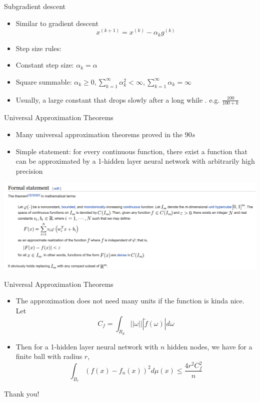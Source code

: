 \documentclass[12pt,notes,mathserif]{beamer}
\newcommand{\chuhao}{\fontsize{44.9pt}{\baselineskip}\selectfont}
\providecommand{\tightlist}{%
	\setlength{\itemsep}{0pt}\setlength{\parskip}{0pt}}
\begin{document}
\begin{frame}{Subgradient descent}

\begin{itemize}
\tightlist
\item
  Similar to gradient descent \[x^{(k+1)}=x^{(k)}-\alpha_k g^{(k)}\]
\item
  Step size rules:
\item
  Constant step size: \(\alpha_k = \alpha\)
\item
  Square summable:
  \(\alpha_k\ge 0, \sum_{k=1}^{\infty} \alpha_k^2 < \infty, \sum_{k=1}^{\infty}\alpha_k =\infty\)
\item
  Usually, a large constant that drops slowly after a long while . e.g.
  \(\frac{100}{100+k}\)
\end{itemize}

\end{frame}

\begin{frame}{Universal Approximation Theorems}

\begin{itemize}
\tightlist
\item
  Many universal approximation theorems proved in the \(90s\)
\item
  Simple statement: for every continuous function, there exist a
  function that can be approximated by a 1-hidden layer neural network
  with arbitrarily high precision
\end{itemize}

\begin{center}
    \includegraphics[width=\textwidth]{2018-04-15-13-11-16.png}
\end{center}

\end{frame}

\begin{frame}{Universal Approximation Theorems}

\begin{itemize}
\tightlist
\item
  The approximation does not need many units if the function is kinda
  nice. Let \[C_{f}=\int_{R_{d}}||\omega|||\tilde{f}(\omega)|d\omega\]
\item
  Then for a 1-hidden layer neural network with \(n\) hidden nodes, we
  have for a finite ball with radius \(r\), \[
  \int_{B_{r}}(f(x)-f_{n}(x))^{2}d \mu(x)\leq\frac{4r^{2}C_{f}^{2}}{n}
  \]
\end{itemize}

\end{frame}

\begin{frame}
	\begin{center}
		\chuhao Thank you!  
	\end{center}
\end{frame}
\end{document}
